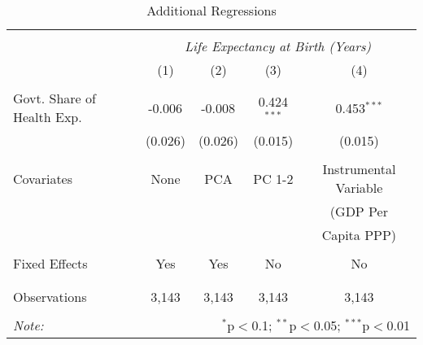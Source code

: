 \begin{table}[!htbp] \centering
  \caption{Additional Regressions \label{additional_regs}}
\begin{tabular}{@{\extracolsep{5pt}}lcccc}
\\[-1.8ex]\hline
\hline \\[-1.8ex]
& \multicolumn{4}{c}{\textit{Life Expectancy at Birth (Years)}} \
\cr \
\\[-1.8ex] & (1) & (2) & (3) & (4) \\
\hline \\[-1.8ex]
 Govt. Share of Health Exp. & -0.006$^{}$ & -0.008$^{}$ & 0.424$^{***}$ & 0.453$^{***}$ \\
  & (0.026) & (0.026) & (0.015) & (0.015) \\
  &  &  &  &  \\
 Covariates & None & PCA & PC 1-2 & Instrumental Variable \\
  &  &  &  & (GDP Per \\
  &  &  &  & Capita PPP) \\
  &  &  &  &  \\
 Fixed Effects & Yes & Yes & No & No \\
  &  &  &  &  \\
\hline \\[-1.8ex]
 Observations & 3,143 & 3,143 & 3,143 & 3,143 \\
\hline
\hline \\[-1.8ex]
\textit{Note:} & \multicolumn{4}{r}{$^{*}$p$<$0.1; $^{**}$p$<$0.05; $^{***}$p$<$0.01} \\
\end{tabular}
\end{table}